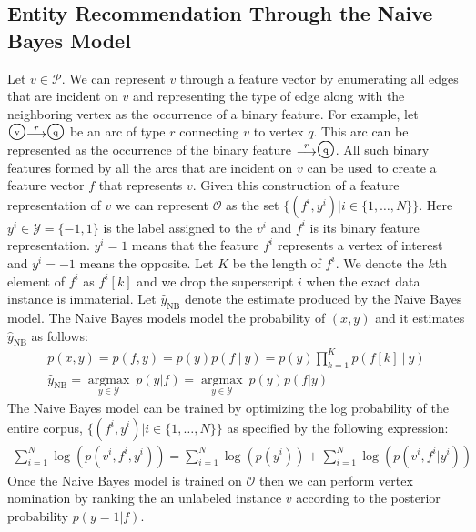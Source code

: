 \documentclass[paper=a4,fontsize=11pt]{scrartcl}
\newcommand{\argmax}[1]{\underset{#1}{\operatorname*{argmax}}}
\numberwithin{equation}{section}    %
\numberwithin{figure}{section}      %
\numberwithin{table}{section}       %
\def\overstrike#1#2{{\setbox0\hbox{$#2$}\hbox to \wd0{\hss$#1$\hss}\kern-\wd0\box0}}
\newcommand{\bigstaten}[1]{\overstrike{\protect\raisebox{1pt}{\mbox{\scriptsize #1}}}{\mbox{\Large $\bigcirc$}}}
\newcommand{\shortarc}[1]{\protect\raisebox{-1pt}{$\stackrel{#1}{\longrightarrow}$}}
\newcommand\given{\:\vert\:}
\begin{document}
\subsection{Entity Recommendation Through the Naive Bayes Model}
\label{sec:er-nb}
Let $v \in \mathcal{P}$. We can represent $v$ through a
feature vector by enumerating all edges that are incident on $v$ and
representing the type of edge along with the neighboring vertex  as the
occurrence of a binary feature. For example, let $\bigstaten{v} \shortarc{r} \bigstaten{q}$
be an arc of type $r$ connecting $v$ to vertex  $q$.
This arc can be represented as the occurrence of the binary feature $\shortarc{r} \bigstaten{q}$.
All such binary features formed by all the arcs that are incident on $v$ can be used to create
a feature vector $f$ that represents $v$.
Given this construction of a feature representation of $v$ we can represent $\mathcal{O}$
as the set $\{(f^i, y^i) | i \in \{1, \ldots, N\}\}$.
Here $y^i\in \mathcal{Y} = \{-1, 1\}$ is the label assigned to the $v^i$ and $f^i$ is its binary
feature representation. $y^i = 1$ means that the feature $f^i$ represents a vertex of interest and $y^i = -1$ means the opposite.
Let $K$ be the length of $f^i$.
We denote the $k$th element of $f^i$ as $f^i[k]$
and we drop the superscript $i$ when the exact data instance is immaterial.
Let $\hat{y}_{\mathrm{NB}}$ denote the estimate produced by the Naive Bayes model.
The Naive Bayes models model the probability of $(x, y)$ and it estimates $\hat{y}_{\mathrm{NB}}$ as follows:
\begin{align}
  p(x, y) = p(f, y) = p(y) p(f \given y) = p(y) \prod_{k=1}^K p(f[k] \given y)\\
  \hat{y}_{\mathrm{NB}} = \argmax{y \in \mathcal{Y}}\ p(y | f) = \argmax{y \in \mathcal{Y}}\ p(y) p(f | y)
\end{align}
The Naive Bayes model can be trained by optimizing the log probability of the entire corpus, $\{(f^i, y^i) | i \in \{1, \ldots, N\}\}$ as specified by the following expression:
\begin{align}
  \sum_{i=1}^N \log(p(v^i, f^i, y^i)) = \sum_{i=1}^N \log(p(y^i)) + \sum_{i=1}^N \log(p(v^i, f^i | y^i))
\end{align}
Once the Naive Bayes model is trained on $\mathcal{O}$ then we can perform vertex nomination
by ranking the an unlabeled instance $v$ according to the posterior probability $p(y=1 | f)$.
\end{document}
